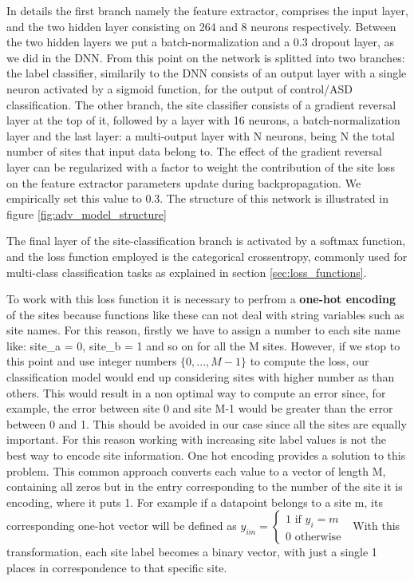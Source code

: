 \documentclass[11pt]{report}
\begin{document}
In details the first branch namely the feature extractor, comprises the input layer, and the two hidden layer consisting on 264 and 8 neurons respectively.
Between the two hidden layers we put a batch-normalization and a 0.3 dropout layer, as we did in the DNN.
From this point on the network is splitted into two branches: the label classifier, similarily to the DNN consists of an output layer with a single neuron activated by a sigmoid function, for the output of control/ASD classification.
The other branch, the site classifier consists of a gradient reversal layer at the top of it, followed by a layer with 16 neurons, a batch-normalization layer and the last layer: a multi-output layer with N neurons, being N the total number of sites that input data belong to.
The effect of the gradient reversal layer can be regularized with a factor to weight the contribution of the site loss on the feature extractor parameters update during backpropagation.
We empirically set this value to 0.3.
The structure of this network is illustrated in figure \ref{fig:adv_model_structure}

The final layer of the site-classification branch is activated by a softmax function, and the loss function employed is the categorical crossentropy, commonly used for multi-class classification tasks as explained in section \ref{sec:loss_functions}.


To work with this loss function it is necessary to perfrom a \textbf{one-hot encoding} of the sites because functions like these can not deal with string variables such as site names.
For this reason, firstly we have to assign a number to each site name like: site\_a = 0, site\_b = 1 and so on for all the M sites.
However, if we stop to this point and use integer numbers $\{0, ..., M-1\}$ to compute the loss, our classification model would end up considering sites with higher number as   than others.
This would result in a non optimal way to compute an error since, for example, the error between site 0 and site M-1 would be greater than the error between 0 and 1.
This should be avoided in our case since all the sites are equally important. For this reason working with increasing site label values is not the best way to encode site information. %
One hot encoding provides a solution to this problem.
This common approach converts each value to a vector of length M, containing all zeros but in the entry corresponding to the number of the site it is encoding, where it puts 1.
For example if a datapoint belongs to a site m, its corresponding one-hot vector will be defined as $y_{im} = \begin{cases} 1  \text{ if } y_i = m \\ 0 \text{ otherwise }\end{cases}$
With this transformation, each site label becomes a binary vector, with just a single 1 places in correspondence to that specific site.
\end{document}

